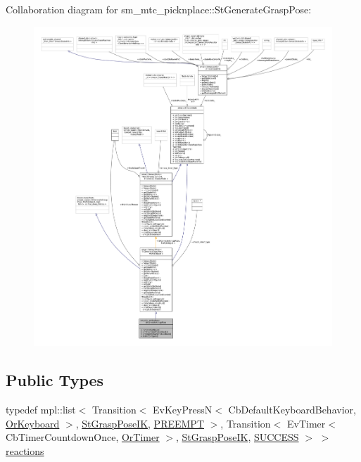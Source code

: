 Collaboration diagram for sm\+\_\+mtc\+\_\+picknplace\+:\+:St\+Generate\+Grasp\+Pose\+:
\nopagebreak
\begin{figure}[H]
\begin{center}
\leavevmode
\includegraphics[width=350pt]{structsm__mtc__picknplace_1_1StGenerateGraspPose__coll__graph}
\end{center}
\end{figure}
\subsection*{Public Types}
\begin{DoxyCompactItemize}
\item 
typedef mpl\+::list$<$ Transition$<$ Ev\+Key\+PressN$<$ Cb\+Default\+Keyboard\+Behavior, \hyperlink{classsm__mtc__picknplace_1_1OrKeyboard}{Or\+Keyboard} $>$, \hyperlink{structsm__mtc__picknplace_1_1StGraspPoseIK}{St\+Grasp\+Pose\+IK}, \hyperlink{classPREEMPT}{P\+R\+E\+E\+M\+PT} $>$, Transition$<$ Ev\+Timer$<$ Cb\+Timer\+Countdown\+Once, \hyperlink{classsm__mtc__picknplace_1_1OrTimer}{Or\+Timer} $>$, \hyperlink{structsm__mtc__picknplace_1_1StGraspPoseIK}{St\+Grasp\+Pose\+IK}, \hyperlink{classSUCCESS}{S\+U\+C\+C\+E\+SS} $>$ $>$ \hyperlink{structsm__mtc__picknplace_1_1StGenerateGraspPose_ac99899a845a0faae70c29ddfd7157f86}{reactions}
\end{DoxyCompactItemize}
